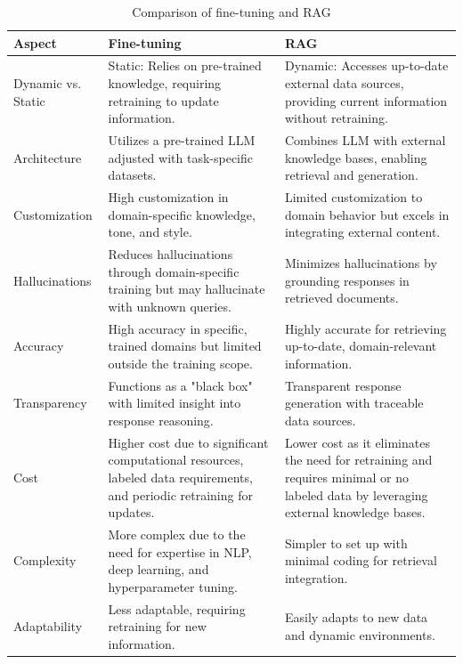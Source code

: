 \begin{table}[H]
    \centering
    \label{tab:comparison_ft_rag}
    \begin{tabular}{p{3cm}p{6cm}p{6cm}}
        \hline
        \textbf{Aspect} & \textbf{Fine-tuning} & \textbf{RAG} \\
        \hline
        Dynamic vs. Static & Static: Relies on pre-trained knowledge, requiring retraining to update information. & Dynamic: Accesses up-to-date external data sources, providing current information without retraining. \\
        \hline
        Architecture & Utilizes a pre-trained LLM adjusted with task-specific datasets. & Combines LLM with external knowledge bases, enabling retrieval and generation. \\
        \hline
        Customization & High customization in domain-specific knowledge, tone, and style. & Limited customization to domain behavior but excels in integrating external content. \\
        \hline
        Hallucinations & Reduces hallucinations through domain-specific training but may hallucinate with unknown queries. & Minimizes hallucinations by grounding responses in retrieved documents. \\
        \hline
        Accuracy & High accuracy in specific, trained domains but limited outside the training scope. & Highly accurate for retrieving up-to-date, domain-relevant information. \\
        \hline
        Transparency & Functions as a "black box" with limited insight into response reasoning. & Transparent response generation with traceable data sources. \\
        \hline
        Cost & Higher cost due to significant computational resources, labeled data requirements, and periodic retraining for updates. & Lower cost as it eliminates the need for retraining and requires minimal or no labeled data by leveraging external knowledge bases. \\
        \hline
        Complexity & More complex due to the need for expertise in NLP, deep learning, and hyperparameter tuning. & Simpler to set up with minimal coding for retrieval integration. \\
        \hline
        Adaptability & Less adaptable, requiring retraining for new information. & Easily adapts to new data and dynamic environments. \\
        \hline
    \end{tabular}
    \caption{Comparison of fine-tuning and RAG}
\end{table}

